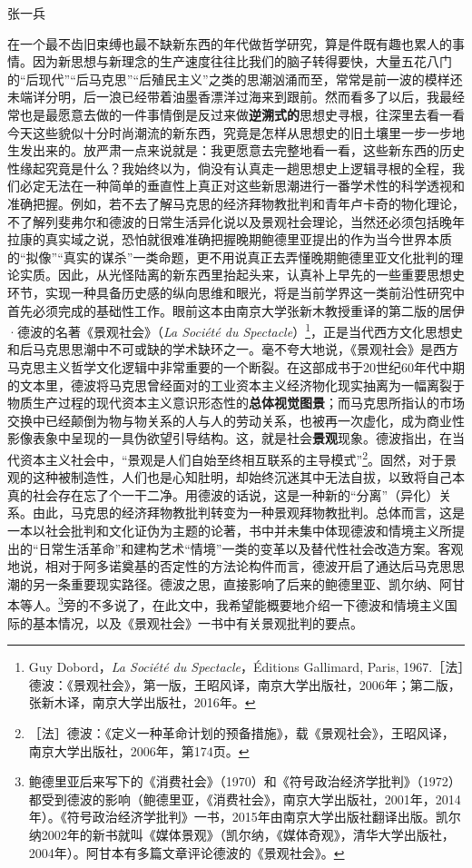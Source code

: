 \documentclass[fontset=fandol, a4paper, 12pt, openright]{ctexbook}
\begin{document}
\begin{center}
{\kaishu 张一兵}
\end{center}

在一个最不齿旧束缚也最不缺新东西的年代做哲学研究，算是件既有趣也累人的事情。因为新思想与新理念的生产速度往往比我们的脑子转得要快，大量五花八门的“后现代”“后马克思”“后殖民主义”之类的思潮汹涌而至，常常是前一波的模样还未端详分明，后一浪已经带着油墨香漂洋过海来到跟前。然而看多了以后，我最经常也是最愿意去做的一件事情倒是反过来做\textbf{逆溯式的}思想史寻根，往深里去看一看今天这些貌似十分时尚潮流的新东西，究竟是怎样从思想史的旧土壤里一步一步地生发出来的。放严肃一点来说就是：我更愿意去完整地看一看，这些新东西的历史性缘起究竟是什么？我始终以为，倘没有认真走一趟思想史上逻辑寻根的全程，我们必定无法在一种简单的垂直性上真正对这些新思潮进行一番学术性的科学透视和准确把握。{\kaishu 例如，若不去了解马克思的经济拜物教批判和青年卢卡奇的物化理论，不了解列斐弗尔和德波的日常生活异化说以及景观社会理论，当然还必须包括晚年拉康的真实域之说，恐怕就很难准确把握晚期鲍德里亚提出的作为当今世界本质的“拟像”“真实的谋杀”一类命题，更不用说真正去弄懂晚期鲍德里亚文化批判的理论实质。}因此，从光怪陆离的新东西里抬起头来，认真补上早先的一些重要思想史环节，实现一种具备历史感的纵向思维和眼光，将是当前学界这一类前沿性研究中首先必须完成的基础性工作。眼前这本由南京大学张新木教授重译的第二版的居伊·德波的名著《景观社会》（\textit{La Société du Spectacle}）\footnote{Guy Dobord，\textit{La Société du Spectacle}，Éditions Gallimard, Paris, 1967.［法］德波：《景观社会》，第一版，王昭风译，南京大学出版社，2006年；第二版，张新木译，南京大学出版社，2016年。}，正是当代西方文化思想史和后马克思思潮中不可或缺的学术缺环之一。毫不夸大地说，《景观社会》是西方马克思主义哲学文化逻辑中非常重要的一个断裂。在这部成书于20世纪60年代中期的文本里，德波将马克思曾经面对的工业资本主义经济物化现实抽离为一幅离裂于物质生产过程的现代资本主义意识形态性的\textbf{总体视觉图景}；而马克思所指认的市场交换中已经颠倒为物与物关系的人与人的劳动关系，也被再一次虚化，成为商业性影像表象中呈现的一具伪欲望引导结构。这，就是社会\textbf{景观}现象。德波指出，在当代资本主义社会中，“景观是人们自始至终相互联系的主导模式”\footnote{［法］德波：《定义一种革命计划的预备措施》，载《景观社会》，王昭风译，南京大学出版社，2006年，第174页。}。固然，对于景观的这种被制造性，人们也是心知肚明，却始终沉迷其中无法自拔，以致将自己本真的社会存在忘了个一干二净。用德波的话说，这是一种新的“分离”（异化）关系。由此，马克思的经济拜物教批判转变为一种景观拜物教批判。总体而言，这是一本以社会批判和文化证伪为主题的论著，书中并未集中体现德波和情境主义所提出的“日常生活革命”和建构艺术“情境”一类的变革以及替代性社会改造方案。客观地说，相对于阿多诺奠基的否定性的方法论构件而言，德波开启了通达后马克思思潮的另一条重要现实路径。{\kaishu 德波之思，直接影响了后来的鲍德里亚、凯尔纳、阿甘本等人。\footnote{鲍德里亚后来写下的《消费社会》（1970）和《符号政治经济学批判》（1972）都受到德波的影响（鲍德里亚，《消费社会》，南京大学出版社，2001年，2014年）。《符号政治经济学批判》一书，2015年由南京大学出版社翻译出版。凯尔纳2002年的新书就叫《媒体景观》（凯尔纳，《媒体奇观》，清华大学出版社，2004年）。阿甘本有多篇文章评论德波的《景观社会》。}}旁的不多说了，在此文中，我希望能概要地介绍一下德波和情境主义国际的基本情况，以及《景观社会》一书中有关景观批判的要点。
\end{document}
